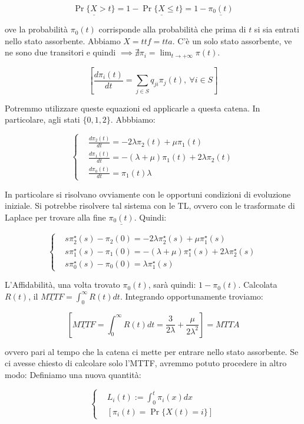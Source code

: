 \[	
	\underline{\Pr\{X > t\}} = 1-\underline{\Pr\{X\leq t\}} = 1-\underline{\pi_0(t)}
\]

ove la probabilità $\pi_0(t)$ corrisponde alla probabilità che prima di $t$ si sia entrati nello stato assorbente. Abbiamo $X=ttf=tta$. C'è un solo stato assorbente, ve ne sono due transitori e quindi $\implies \nexists \pi_i=\lim_{t\to +\infty}{\pi(t)}$. 

\[
	[\frac{d \pi_i(t)}{dt} = \sum_{j\in S}{q_{ji}\pi_j(t)},\ \forall i\in S]
\]

Potremmo utilizzare queste equazioni ed applicarle a questa catena. In particolare, agli stati $\{0,1,2\}$. Abbbiamo:

\[
	\left\{
	\begin{aligned}
	&\frac{d \pi_2(t)}{dt} = -2\lambda\pi_2(t)+\mu\pi_1(t)\\
	&\frac{d \pi_1(t)}{dt} = -(\lambda+\mu)\pi_1(t) +2\lambda\pi_2(t)\\
	&\frac{d \pi_0(t)}{dt} = \pi_1(t)\lambda
	\end{aligned}
	\right.
\]

In particolare si risolvano ovviamente con le opportuni condizioni di evoluzione iniziale. Si potrebbe risolvere tal sistema con le TL, ovvero con le trasformate di Laplace per trovare alla fine $\underline{\pi_0(t)}$. Quindi:

\[	
	\left\{
	\begin{aligned}
	&s\pi_2^\star(s) -\pi_2(0) = -2\lambda\pi_2^\star(s) +\mu\pi_1^\star(s)\\
	&s\pi_1^\star(s) -\pi_1(0) = -(\lambda+\mu)\pi_1^\star(s) + 2\lambda\pi_2^\star(s)\\
	&s\pi_0^\star(s) -\pi_0(0) = \lambda\pi_1^\star(s)
	\end{aligned}
	\right.
\]

L'Affidabilità, una volta trovato $\pi_0(t)$, sarà quindi: $1-\pi_0(t)$. Calcolata $R(t)$, il $\underline{MTTF} = \int_0^\infty{R(t)dt}$. Integrando opportunamente troviamo:

\[
	[\underline{MTTF} = \int_0^\infty{R(t)dt} = \frac{3}{2\lambda} + \frac{\mu}{2\lambda^2}] = MTTA
\]

ovvero pari al tempo che la catena ci mette per entrare nello stato assorbente. Se ci avesse chiesto di calcolare solo l'MTTF, avremmo potuto procedere in altro modo: Definiamo una nuova quantità:

\[
	\left\{
	\begin{aligned}
	&L_i(t) := \int_0^t{\pi_i(x)dx}\\
	&[\pi_i(t) = \Pr\{X(t)=i\}]
	\end{aligned}
	\right.
\]

